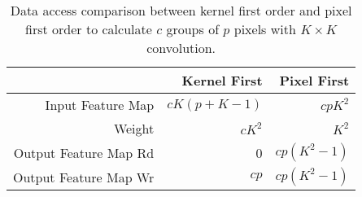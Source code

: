 \begin{table}[htbp]
    \centering
    \caption{Data access comparison between kernel first order and pixel first order to calculate $c$ groups of $p$ pixels with $K\times K$ convolution.}
    \vspace{-5pt}
      \begin{tabular}{|r|r|r|}
      \hline
            & Kernel First & Pixel First \\
      \hline
      Input Feature Map & $cK(p+K-1)$ & $cpK^2$ \\
      \hline
      Weight & $cK^2$ & $K^2$ \\
      \hline
      Output Feature Map Rd & 0 & $cp(K^2-1)$ \\
      \hline
      Output Feature Map Wr & $cp$ & $cp(K^2-1)$ \\
      \hline
      \end{tabular}
    \label{tab:ram_acc}
  \end{table}